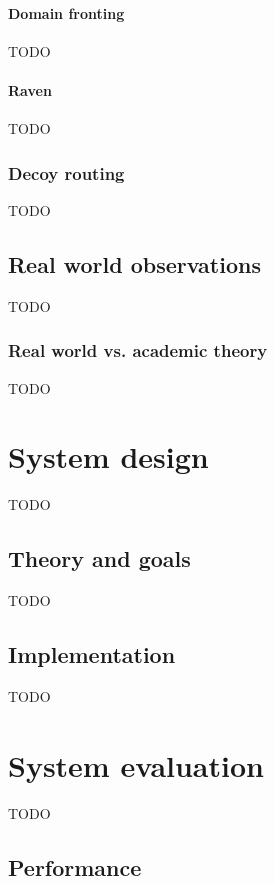 \documentclass[12pt]{report}
\begin{document}
\subsubsection{Domain fronting}

TODO

\subsubsection{Raven}

TODO

\subsection{Decoy routing}

TODO

\section{Real world observations}

TODO

\subsection{Real world vs. academic theory}

TODO

\chapter{System design}

TODO

\section{Theory and goals}

TODO

\section{Implementation}

TODO

\chapter{System evaluation}

TODO

\section{Performance}
\end{document}

